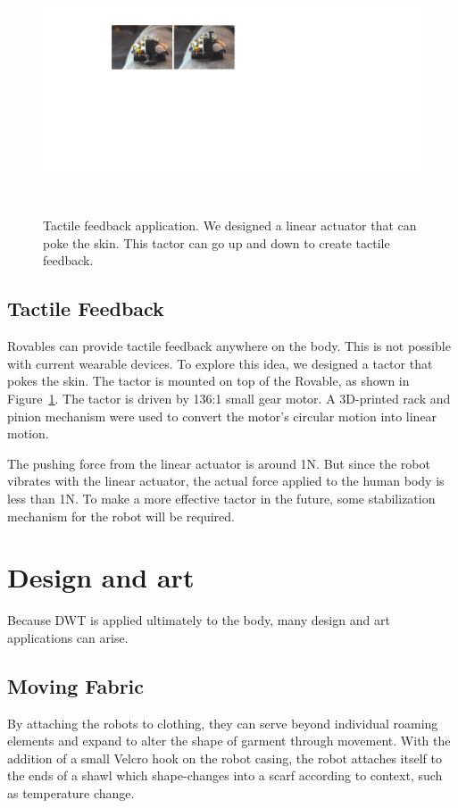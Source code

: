 \begin{figure}[!t]
\centering
  \includegraphics[width=1\columnwidth]{pictures/chapter4/linear_actuator.pdf}
  \caption{Tactile feedback application. We designed a linear actuator that can poke the skin. This tactor can go up and down to create tactile feedback.}~\label{fig:actuator}
\end{figure}

\subsection{Tactile Feedback}
Rovables can provide tactile feedback anywhere on the body. This is not possible with current wearable devices. To explore this idea, we designed a tactor that pokes the skin. The tactor is mounted on top of the Rovable, as shown in Figure~\ref{fig:actuator}. The tactor is driven by 136:1 small gear motor. A 3D-printed rack and pinion mechanism were used to convert the motor's circular motion into linear motion. 

The pushing force from the linear actuator is around 1N. But since the robot vibrates with the linear actuator, the actual force applied to the human body is less than 1N. To make a more effective tactor in the future, some stabilization mechanism for the robot will be required. 


\section{Design and art}
Because DWT is applied ultimately to the body, many design and art applications can arise. 

\subsection{Moving Fabric}
By attaching the robots to clothing, they can serve beyond individual roaming elements and expand to alter the shape of garment through movement. With the addition of a small Velcro hook on the robot casing, the robot attaches itself to the ends of a shawl which shape-changes into a scarf according to context, such as temperature change.  

